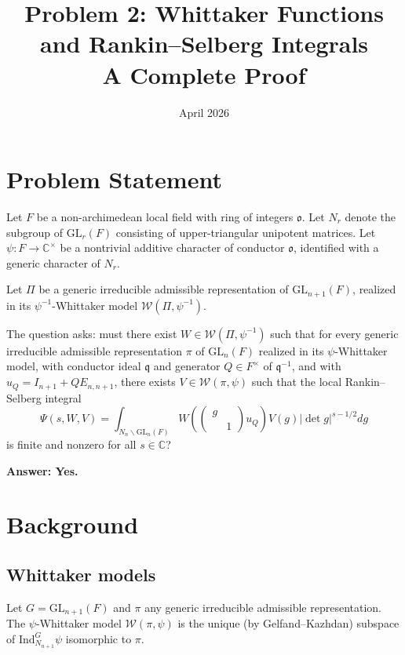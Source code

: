 \documentclass[12pt]{article}
\title{Problem 2: Whittaker Functions and Rankin--Selberg Integrals\\
\large A Complete Proof}
\author{}
\date{April 2026}
\begin{document}
\maketitle

\section{Problem Statement}

Let $F$ be a non-archimedean local field with ring of integers $\mathfrak{o}$. Let $N_r$ denote the subgroup of $\mathrm{GL}_r(F)$ consisting of upper-triangular unipotent matrices. Let $\psi: F \to \mathbb{C}^\times$ be a nontrivial additive character of conductor $\mathfrak{o}$, identified with a generic character of $N_r$.

Let $\Pi$ be a generic irreducible admissible representation of $\mathrm{GL}_{n+1}(F)$, realized in its $\psi^{-1}$-Whittaker model $\mathcal{W}(\Pi, \psi^{-1})$.

The question asks: must there exist $W \in \mathcal{W}(\Pi, \psi^{-1})$ such that for every generic irreducible admissible representation $\pi$ of $\mathrm{GL}_n(F)$ realized in its $\psi$-Whittaker model, with conductor ideal $\mathfrak{q}$ and generator $Q \in F^\times$ of $\mathfrak{q}^{-1}$, and with $u_Q = I_{n+1} + Q E_{n,n+1}$, there exists $V \in \mathcal{W}(\pi, \psi)$ such that the local Rankin--Selberg integral
\[
\Psi(s, W, V) = \int_{N_n \backslash \mathrm{GL}_n(F)} W\!\left(\begin{pmatrix} g & \\ & 1 \end{pmatrix} u_Q\right) V(g) |\det g|^{s - 1/2} dg
\]
is finite and nonzero for all $s \in \mathbb{C}$?

\textbf{Answer: Yes.}

\section{Background}

\subsection{Whittaker models}

Let $G = \mathrm{GL}_{n+1}(F)$ and $\pi$ any generic irreducible admissible representation. The $\psi$-Whittaker model $\mathcal{W}(\pi, \psi)$ is the unique (by Gelfand--Kazhdan) subspace of $\mathrm{Ind}_{N_{n+1}}^{G} \psi$ isomorphic to $\pi$.
\end{document}
